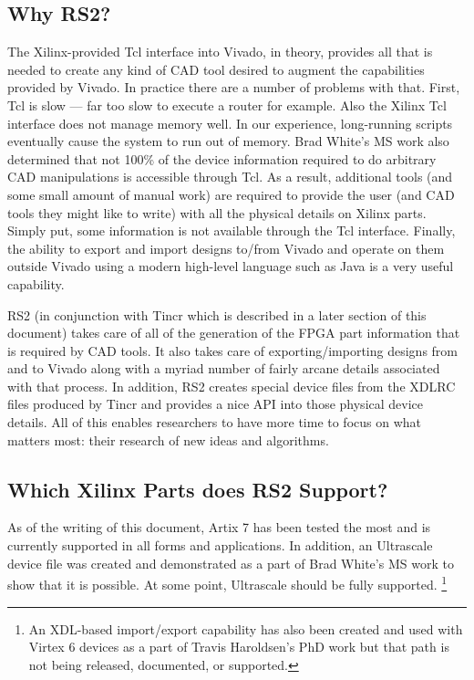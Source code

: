 \documentclass[10pt]{article}
\begin{document}
\subsection{Why RS2?}
The Xilinx-provided Tcl interface into Vivado, in theory, provides all that is
needed to create any kind of CAD tool desired to augment the capabilities
provided by Vivado.  In practice there are a number of problems with that.
First, Tcl is slow --- far too slow to execute a router for example.  Also the
Xilinx Tcl interface does not manage memory well.  In our experience,
long-running scripts eventually cause the system to run out of memory. 
Brad White's MS work also determined
that not 100\% of the device information required to do arbitrary CAD
manipulations is accessible through Tcl.  As a result, additional tools (and
some small amount of manual work) are required to provide the user (and CAD
tools they might like to write) with all the physical details on Xilinx parts.
Simply put, some information is not available through the Tcl interface. 
Finally, the ability to export and import designs to/from Vivado and operate
on them outside Vivado using a modern high-level language such as Java is a
very useful capability.

RS2 (in conjunction with Tincr which is described in a later section of this
document) takes care of all of the generation of the FPGA part information that
is required by CAD tools. It also takes care of exporting/importing designs from
and to Vivado along with a myriad number of fairly arcane details associated
with that process.  In addition, RS2 creates special device files from the XDLRC
files produced by Tincr and provides a nice API into those physical device
details.  All of this enables researchers to have more time to focus on what
matters most: their research of new ideas and algorithms.

\subsection{Which Xilinx Parts does RS2 Support?}
As of the writing of this document, Artix 7 has been tested the most and is
currently supported in all forms and applications.  In addition, an Ultrascale
device file was created and demonstrated as a part of Brad White's MS work to
show that it is possible.  At some point, Ultrascale should be fully supported.
\footnote{An XDL-based import/export capability has also been created and used
with Virtex 6 devices as a part of Travis Haroldsen's PhD work but that path is
not being released, documented, or supported.}
\end{document}
